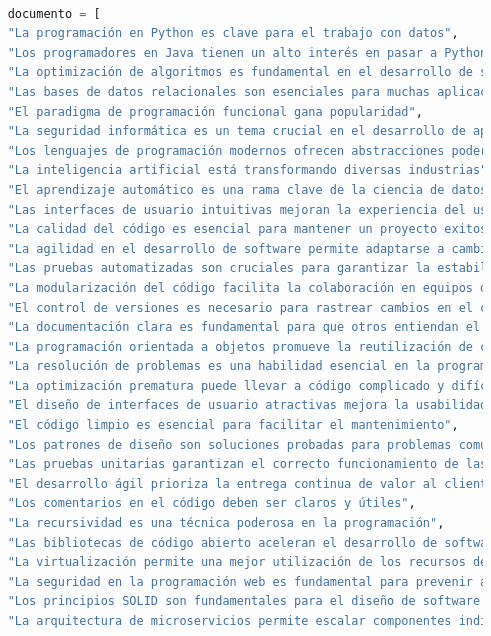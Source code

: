 \documentclass[journal, spanish]{IEEEtran}
\begin{document}
\lstset{style=codestyle}
\begin{lstlisting}[language=Python]
    
    documento = [
    "La programación en Python es clave para el trabajo con datos",
    "Los programadores en Java tienen un alto interés en pasar a Python",
    "La optimización de algoritmos es fundamental en el desarrollo de software",
    "Las bases de datos relacionales son esenciales para muchas aplicaciones",
    "El paradigma de programación funcional gana popularidad",
    "La seguridad informática es un tema crucial en el desarrollo de aplicaciones web",
    "Los lenguajes de programación modernos ofrecen abstracciones poderosas",
    "La inteligencia artificial está transformando diversas industrias",
    "El aprendizaje automático es una rama clave de la ciencia de datos",
    "Las interfaces de usuario intuitivas mejoran la experiencia del usuario",
    "La calidad del código es esencial para mantener un proyecto exitoso",
    "La agilidad en el desarrollo de software permite adaptarse a cambios rápidamente",
    "Las pruebas automatizadas son cruciales para garantizar la estabilidad del software",
    "La modularización del código facilita la colaboración en equipos de programadores",
    "El control de versiones es necesario para rastrear cambios en el código",
    "La documentación clara es fundamental para que otros entiendan el código",
    "La programación orientada a objetos promueve la reutilización de código",
    "La resolución de problemas es una habilidad esencial en la programación",
    "La optimización prematura puede llevar a código complicado y difícil de mantener",
    "El diseño de interfaces de usuario atractivas mejora la usabilidad de las aplicaciones",
    "El código limpio es esencial para facilitar el mantenimiento",
    "Los patrones de diseño son soluciones probadas para problemas comunes",
    "Las pruebas unitarias garantizan el correcto funcionamiento de las partes del código",
    "El desarrollo ágil prioriza la entrega continua de valor al cliente",
    "Los comentarios en el código deben ser claros y útiles",
    "La recursividad es una técnica poderosa en la programación",
    "Las bibliotecas de código abierto aceleran el desarrollo de software",
    "La virtualización permite una mejor utilización de los recursos de hardware",
    "La seguridad en la programación web es fundamental para prevenir ataques",
    "Los principios SOLID son fundamentales para el diseño de software robusto",
    "La arquitectura de microservicios permite escalar componentes individualmente",

\end{lstlisting}
\end{document}
